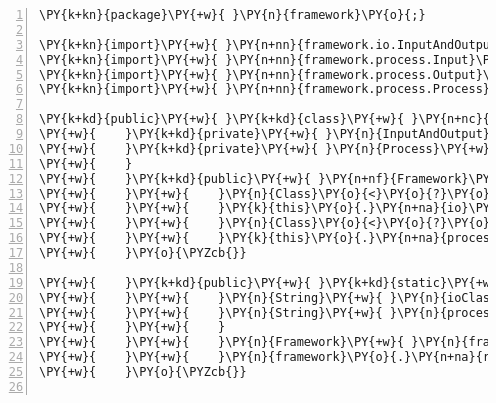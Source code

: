 \begin{Verbatim}[commandchars=\\\{\},numbers=left,firstnumber=1,stepnumber=1,frame=single,fontsize=\small]
\PY{k+kn}{package}\PY{+w}{ }\PY{n}{framework}\PY{o}{;}

\PY{k+kn}{import}\PY{+w}{ }\PY{n+nn}{framework.io.InputAndOutput}\PY{o}{;}
\PY{k+kn}{import}\PY{+w}{ }\PY{n+nn}{framework.process.Input}\PY{o}{;}
\PY{k+kn}{import}\PY{+w}{ }\PY{n+nn}{framework.process.Output}\PY{o}{;}
\PY{k+kn}{import}\PY{+w}{ }\PY{n+nn}{framework.process.Process}\PY{o}{;}

\PY{k+kd}{public}\PY{+w}{ }\PY{k+kd}{class}\PY{+w}{ }\PY{n+nc}{Framework}\PY{+w}{ }\PY{o}{\PYZob{}}
\PY{+w}{    }\PY{k+kd}{private}\PY{+w}{ }\PY{n}{InputAndOutput}\PY{+w}{ }\PY{n}{io}\PY{o}{;}
\PY{+w}{    }\PY{k+kd}{private}\PY{+w}{ }\PY{n}{Process}\PY{+w}{ }\PY{n}{process}\PY{o}{;}
\PY{+w}{    }
\PY{+w}{    }\PY{k+kd}{public}\PY{+w}{ }\PY{n+nf}{Framework}\PY{o}{(}\PY{n}{String}\PY{+w}{ }\PY{n}{ioClass}\PY{o}{,}\PY{+w}{ }\PY{n}{String}\PY{+w}{ }\PY{n}{processClass}\PY{o}{)}\PY{+w}{ }\PY{k+kd}{throws}\PY{+w}{ }\PY{n}{ClassNotFoundException}\PY{o}{,}\PY{+w}{ }\PY{n}{InstantiationException}\PY{o}{,}\PY{+w}{ }\PY{n}{IllegalAccessException}\PY{+w}{ }\PY{o}{\PYZob{}}
\PY{+w}{    }\PY{+w}{    }\PY{n}{Class}\PY{o}{<}\PY{o}{?}\PY{o}{>}\PY{+w}{ }\PY{n}{io}\PY{+w}{ }\PY{o}{=}\PY{+w}{ }\PY{n}{Class}\PY{o}{.}\PY{n+na}{forName}\PY{o}{(}\PY{n}{ioClass}\PY{o}{)}\PY{o}{;}
\PY{+w}{    }\PY{+w}{    }\PY{k}{this}\PY{o}{.}\PY{n+na}{io}\PY{+w}{ }\PY{o}{=}\PY{+w}{ }\PY{o}{(}\PY{n}{InputAndOutput}\PY{o}{)}\PY{+w}{ }\PY{n}{io}\PY{o}{.}\PY{n+na}{newInstance}\PY{o}{(}\PY{o}{)}\PY{o}{;}
\PY{+w}{    }\PY{+w}{    }\PY{n}{Class}\PY{o}{<}\PY{o}{?}\PY{o}{>}\PY{+w}{ }\PY{n}{process}\PY{+w}{ }\PY{o}{=}\PY{+w}{ }\PY{n}{Class}\PY{o}{.}\PY{n+na}{forName}\PY{o}{(}\PY{n}{processClass}\PY{o}{)}\PY{o}{;}
\PY{+w}{    }\PY{+w}{    }\PY{k}{this}\PY{o}{.}\PY{n+na}{process}\PY{+w}{ }\PY{o}{=}\PY{+w}{ }\PY{o}{(}\PY{n}{Process}\PY{o}{)}\PY{+w}{ }\PY{n}{process}\PY{o}{.}\PY{n+na}{newInstance}\PY{o}{(}\PY{o}{)}\PY{o}{;}
\PY{+w}{    }\PY{o}{\PYZcb{}}

\PY{+w}{    }\PY{k+kd}{public}\PY{+w}{ }\PY{k+kd}{static}\PY{+w}{ }\PY{k+kt}{void}\PY{+w}{ }\PY{n+nf}{main}\PY{o}{(}\PY{n}{String}\PY{o}{[}\PY{o}{]}\PY{+w}{ }\PY{n}{args}\PY{o}{)}\PY{+w}{ }\PY{k+kd}{throws}\PY{+w}{ }\PY{n}{Exception}\PY{+w}{ }\PY{o}{\PYZob{}}
\PY{+w}{    }\PY{+w}{    }\PY{n}{String}\PY{+w}{ }\PY{n}{ioClass}\PY{+w}{ }\PY{o}{=}\PY{+w}{ }\PY{n}{args}\PY{o}{[}\PY{l+m+mi}{0}\PY{o}{]}\PY{o}{;}
\PY{+w}{    }\PY{+w}{    }\PY{n}{String}\PY{+w}{ }\PY{n}{processClass}\PY{+w}{ }\PY{o}{=}\PY{+w}{ }\PY{n}{args}\PY{o}{[}\PY{l+m+mi}{1}\PY{o}{]}\PY{o}{;}
\PY{+w}{    }\PY{+w}{    }
\PY{+w}{    }\PY{+w}{    }\PY{n}{Framework}\PY{+w}{ }\PY{n}{framework}\PY{+w}{ }\PY{o}{=}\PY{+w}{ }\PY{k}{new}\PY{+w}{ }\PY{n}{Framework}\PY{o}{(}\PY{n}{ioClass}\PY{o}{,}\PY{+w}{ }\PY{n}{processClass}\PY{o}{)}\PY{o}{;}
\PY{+w}{    }\PY{+w}{    }\PY{n}{framework}\PY{o}{.}\PY{n+na}{run}\PY{o}{(}\PY{o}{)}\PY{o}{;}
\PY{+w}{    }\PY{o}{\PYZcb{}}


\end{Verbatim}
